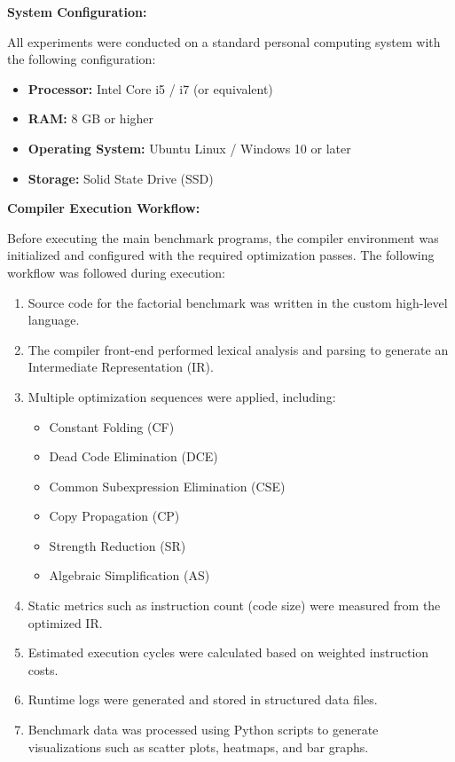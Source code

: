 \documentclass[conference]{IEEEtran}
\begin{document}
\textbf{System Configuration:}

All experiments were conducted on a standard personal computing system with the following configuration:

\begin{itemize}

\item \textbf{Processor:} Intel Core i5 / i7 (or equivalent)
\item \textbf{RAM:} 8 GB or higher
\item \textbf{Operating System:} Ubuntu Linux / Windows 10 or later
\item \textbf{Storage:} Solid State Drive (SSD)

\end{itemize}

\textbf{Compiler Execution Workflow:}

Before executing the main benchmark programs, the compiler environment was initialized and configured with the required optimization passes. The following workflow was followed during execution:

\begin{enumerate}

\item Source code for the factorial benchmark was written in the custom high-level language.

\item The compiler front-end performed lexical analysis and parsing to generate an Intermediate Representation (IR).

\item Multiple optimization sequences were applied, including:
    \begin{itemize}
        \item Constant Folding (CF)
        \item Dead Code Elimination (DCE)
        \item Common Subexpression Elimination (CSE)
        \item Copy Propagation (CP)
        \item Strength Reduction (SR)
        \item Algebraic Simplification (AS)
    \end{itemize}

\item Static metrics such as instruction count (code size) were measured from the optimized IR.

\item Estimated execution cycles were calculated based on weighted instruction costs.

\item Runtime logs were generated and stored in structured data files.

\item Benchmark data was processed using Python scripts to generate visualizations such as scatter plots, heatmaps, and bar graphs.

\end{enumerate}
\end{document}
